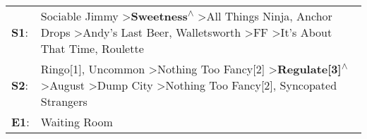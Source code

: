 \begin{supertabular}{p{0.03\textwidth}p{0.92\textwidth}}
 \textbf{S1}:  &  Sociable Jimmy\textsuperscript{} \textgreater \enspace \textbf{Sweetness\textsuperscript{$\wedge$}} \textgreater \enspace All Things Ninja\textsuperscript{}, \enspace Anchor Drops\textsuperscript{} \textgreater \enspace Andy's Last Beer\textsuperscript{}, \enspace Walletsworth\textsuperscript{} \textgreater \enspace FF\textsuperscript{} \textgreater \enspace It's About That Time\textsuperscript{}, \enspace Roulette\textsuperscript{}  \enspace  \\
 \textbf{S2}:  &                                      Ringo[1]\textsuperscript{}, \enspace Uncommon\textsuperscript{} \textgreater \enspace Nothing Too Fancy[2]\textsuperscript{} \textgreater \enspace \textbf{Regulate[3]\textsuperscript{$\wedge$}} \textgreater \enspace August\textsuperscript{} \textgreater \enspace Dump City\textsuperscript{} \textgreater \enspace Nothing Too Fancy[2]\textsuperscript{}, \enspace Syncopated Strangers\textsuperscript{}  \enspace  \\
 \textbf{E1}:  &                                                                                                                                                                                                                                                                                                                                                                                                                        Waiting Room\textsuperscript{}  \enspace  \\
\end{supertabular}

